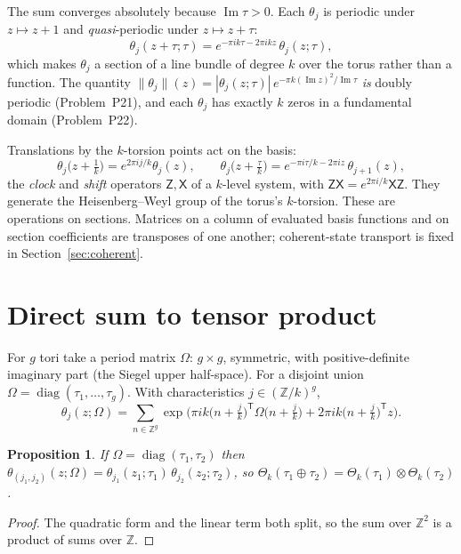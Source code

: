 \documentclass[11pt]{article}
\newtheorem{proposition}[theorem]{Proposition}
\theoremstyle{definition}
\theoremstyle{remark}
\newcommand{\Z}{\mathbb{Z}}
\begin{document}
The sum converges absolutely because $\operatorname{Im}\tau > 0$. Each
$\theta_j$ is periodic under $z \mapsto z+1$ and \emph{quasi}-periodic under
$z \mapsto z+\tau$:
\[
  \theta_j(z+\tau;\tau) = e^{-\pi i k \tau - 2\pi i k z}\,\theta_j(z;\tau),
\]
which makes $\theta_j$ a section of a line bundle of degree $k$ over the
torus rather than a function. The quantity
$\|\theta_j\|(z) = |\theta_j(z;\tau)|\,e^{-\pi k (\operatorname{Im} z)^2/\operatorname{Im}\tau}$
\emph{is} doubly periodic (Problem~P21), and each $\theta_j$ has
exactly $k$ zeros in a fundamental domain (Problem~P22).

Translations by the $k$-torsion points act on the basis:
\[
  \theta_j\big(z+\tfrac1k\big) = e^{2\pi i j/k}\theta_j(z), \qquad
  \theta_j\big(z+\tfrac{\tau}{k}\big) = e^{-\pi i \tau/k - 2\pi i z}\,\theta_{j+1}(z),
\]
the \emph{clock} and \emph{shift} operators $\mathsf Z, \mathsf X$ of a
$k$-level system, with $\mathsf Z\mathsf X = e^{2\pi i/k}\mathsf X\mathsf Z$.
They generate the Heisenberg--Weyl group of the torus's $k$-torsion.
These are operations on sections. Matrices on a column of evaluated basis
functions and on section coefficients are transposes of one another;
coherent-state transport is fixed in Section~\ref{sec:coherent}.

\section{Direct sum to tensor product}\label{sec:tensor}

For $g$ tori take a period matrix $\Omega$: $g\times g$, symmetric, with
positive-definite imaginary part (the Siegel upper half-space). For a
disjoint union $\Omega = \operatorname{diag}(\tau_1,\dots,\tau_g)$. With
characteristics $j \in (\Z/k)^g$,
\[
  \theta_j(z;\Omega) = \sum_{n\in\Z^g}
  \exp\!\Big(\pi i k\big(n+\tfrac{j}{k}\big)^{\!\mathsf T}\Omega\big(n+\tfrac{j}{k}\big)
  + 2\pi i k\big(n+\tfrac{j}{k}\big)^{\!\mathsf T} z\Big).
\]

\begin{proposition}\label{prop:factor}
If $\Omega = \operatorname{diag}(\tau_1,\tau_2)$ then $\theta_{(j_1,j_2)}(z;\Omega)
= \theta_{j_1}(z_1;\tau_1)\,\theta_{j_2}(z_2;\tau_2)$, so
$\Theta_k(\tau_1\oplus\tau_2) = \Theta_k(\tau_1)\otimes\Theta_k(\tau_2)$.
\end{proposition}
\begin{proof}
The quadratic form and the linear term both split, so the sum over $\Z^2$
is a product of sums over $\Z$.
\end{proof}
\end{document}
